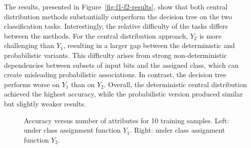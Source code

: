 The results, presented in Figure~\ref{fig:f1-f2-results}, show that both central distribution
methods substantially outperform the decision tree on the two classification tasks.
Interestingly, the relative difficulty of the tasks differs between the methods.
For the central distribution approach, $Y_2$ is more challenging than $Y_1$, resulting in a larger gap between the
deterministic and probabilistic variants.
This difficulty arises from strong non-deterministic dependencies between subsets of input bits and the assigned
class, which can create misleading probabilistic associations.
In contrast, the decision tree performs worse on $Y_1$ than on $Y_2$.
Overall, the deterministic central distribution achieved the highest accuracy, while the probabilistic version
produced similar but slightly weaker results.

\begin{figure}[t]
    \centering
    \caption{
        Accuracy versus number of attributes for 10 training samples.
        Left: under class assignment function $Y_1$.
        Right: under class assignment function $Y_2$.}
    \label{fig:f1-f2-10samples-results}
\end{figure}

